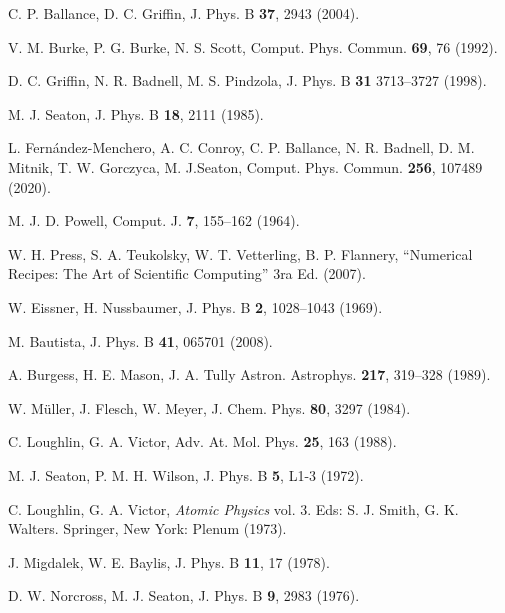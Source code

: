 \begin{thebibliography}{9}
C. P. Ballance, D. C. Griffin, 
J. Phys. B \textbf{37}, 2943 (2004).

V. M. Burke, P. G. Burke, N. S. Scott, 
Comput. Phys. Commun. \textbf{69}, 76 (1992).

D. C. Griffin, N. R. Badnell, M. S. Pindzola, 
J. Phys. B \textbf{31} 3713--3727 (1998).

M. J. Seaton, 
J. Phys. B \textbf{18}, 2111 (1985).

L. Fernández-Menchero, A. C. Conroy, C. P. Ballance, N. R. Badnell, 
D. M. Mitnik, T. W. Gorczyca, M. J.Seaton,
Comput. Phys. Commun. \textbf{256}, 107489 (2020).

M. J. D. Powell, 
Comput. J. \textbf{7}, 155--162 (1964). 

W. H. Press, S. A. Teukolsky, W. T. Vetterling, B. P. Flannery, 
``Numerical Recipes: The Art of Scientific Computing'' 3ra Ed. (2007).


W. Eissner, H. Nussbaumer,
J. Phys. B \textbf{2}, 1028--1043 (1969).

M. Bautista,
J. Phys. B \textbf{41}, 065701 (2008).

A. Burgess, H. E. Mason, J. A. Tully
Astron. Astrophys. \textbf{217}, 319--328 (1989).

W. M\"uller, J. Flesch, W. Meyer,
J. Chem. Phys. \textbf{80}, 3297 (1984).

C. Loughlin, G. A. Victor,
Adv. At. Mol. Phys. \textbf{25}, 163 (1988).

M. J. Seaton, P. M. H. Wilson,
J. Phys. B \textbf{5}, L1-3 (1972).

C. Loughlin, G. A. Victor,
\textit{Atomic Physics} vol. 3. 
Eds: S. J. Smith, G. K. Walters.
Springer, New York: Plenum (1973).

J. Migdalek, W. E. Baylis,
J. Phys. B \textbf{11}, 17 (1978).

D. W. Norcross, M. J. Seaton,
J. Phys. B \textbf{9}, 2983 (1976).


\end{thebibliography}
